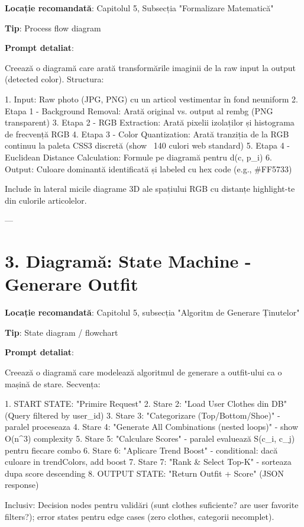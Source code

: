 \textbf{Locație recomandată}: Capitolul 5, Subsecția "Formalizare Matematică"

\textbf{Tip}: Process flow diagram

\textbf{Prompt detaliat}:

Creează o diagramă care arată transformările imaginii de la raw input la output (detected color). Structura:

1. Input: Raw photo (JPG, PNG) cu un articol vestimentar în fond neuniform
2. Etapa 1 - Background Removal: Arată original vs. output al rembg (PNG transparent)
3. Etapa 2 - RGB Extraction: Arată pixelii izolaților și histograma de frecvență RGB
4. Etapa 3 - Color Quantization: Arată tranziția de la RGB continuu la paleta CSS3 discretă (show ~140 culori web standard)
5. Etapa 4 - Euclidean Distance Calculation: Formule pe diagramă pentru d(c, p_i)
6. Output: Culoare dominantă identificată și labeled cu hex code (e.g., #FF5733)

Include în lateral micile diagrame 3D ale spațiului RGB cu distanțe highlight-te din culorile articolelor.

---

\section{3. Diagramă: State Machine - Generare Outfit}

\textbf{Locație recomandată}: Capitolul 5, subsecția "Algoritm de Generare Ținutelor"

\textbf{Tip}: State diagram / flowchart

\textbf{Prompt detaliat}:

Creează o diagramă care modelează algoritmul de generare a outfit-ului ca o mașină de stare. Secvența:

1. START STATE: "Primire Request"
2. Stare 2: "Load User Clothes din DB" (Query filtered by user_id)
3. Stare 3: "Categorizare (Top/Bottom/Shoe)" - paralel proceseaza
4. Stare 4: "Generate All Combinations (nested loops)" - show O(n^3) complexity
5. Stare 5: "Calculare Scores" - paralel evaluează S(c_i, c_j) pentru fiecare combo
6. Stare 6: "Aplicare Trend Boost" - conditional: dacă culoare in trendColors, add boost
7. Stare 7: "Rank & Select Top-K" - sorteaza dupa score descending
8. OUTPUT STATE: "Return Outfit + Score" (JSON response)

Inclusiv: Decision nodes pentru validări (sunt clothes suficiente? are user favorite filters?); error states pentru edge cases (zero clothes, categorii necomplet).

